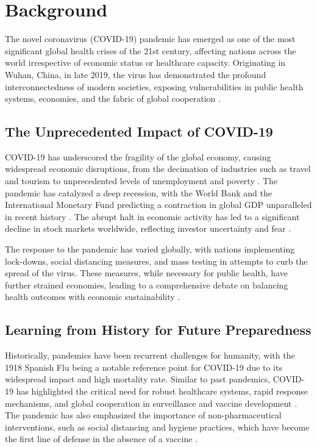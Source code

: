 \chapter{Background}

The novel coronavirus (COVID-19) pandemic has emerged as one of the most significant global health crises of the 21st century, affecting nations across the world irrespective of economic status or healthcare capacity. Originating in Wuhan, China, in late 2019, the virus has demonstrated the profound interconnectedness of modern societies, exposing vulnerabilities in public health systems, economies, and the fabric of global cooperation \parencite{Verma2021AReturns, Shrestha2020TheGlobalization, LegeseFeyisa2020TheReview, MaitalEllaBarzani2020EResearch}.

\section{The Unprecedented Impact of COVID-19}

COVID-19 has underscored the fragility of the global economy, causing widespread economic disruptions, from the decimation of industries such as travel and tourism to unprecedented levels of unemployment and poverty \parencite{Verma2021AReturns, LegeseFeyisa2020TheReview}. The pandemic has catalyzed a deep recession, with the World Bank and the International Monetary Fund predicting a contraction in global GDP unparalleled in recent history \parencite{Verma2021AReturns, Shrestha2020TheGlobalization, LegeseFeyisa2020TheReview, MaitalEllaBarzani2020EResearch}. The abrupt halt in economic activity has led to a significant decline in stock markets worldwide, reflecting investor uncertainty and fear \parencite{Verma2021AReturns}.

The response to the pandemic has varied globally, with nations implementing lock-downs, social distancing measures, and mass testing in attempts to curb the spread of the virus. These measures, while necessary for public health, have further strained economies, leading to a comprehensive debate on balancing health outcomes with economic sustainability \parencite{Shrestha2020TheGlobalization, LegeseFeyisa2020TheReview}.

\section{Learning from History for Future Preparedness}

Historically, pandemics have been recurrent challenges for humanity, with the 1918 Spanish Flu being a notable reference point for COVID-19 due to its widespread impact and high mortality rate. Similar to past pandemics, COVID-19 has highlighted the critical need for robust healthcare systems, rapid response mechanisms, and global cooperation in surveillance and vaccine development \parencite{Shrestha2020TheGlobalization, MaitalEllaBarzani2020EResearch}. The pandemic has also emphasized the importance of non-pharmaceutical interventions, such as social distancing and hygiene practices, which have become the first line of defense in the absence of a vaccine \parencite{LegeseFeyisa2020TheReview, MaitalEllaBarzani2020EResearch}.

